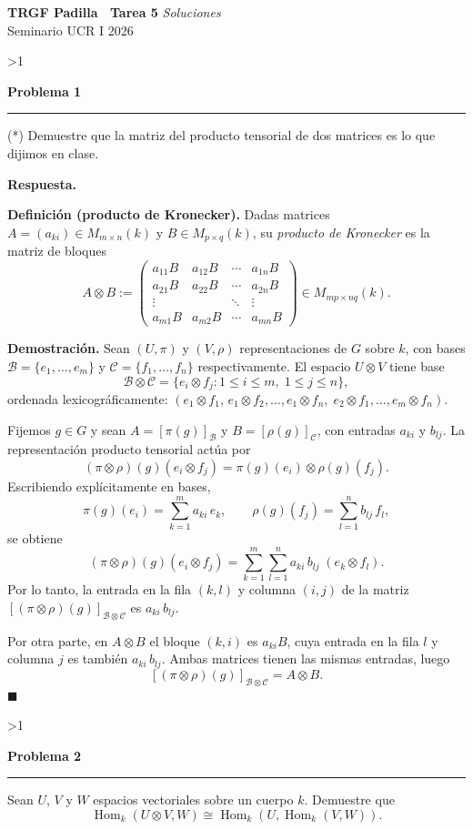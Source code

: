 \documentclass[10pt,a4paper]{article}
\newcommand{\Hom}{\operatorname{Hom}}
\newcommand{\inlinehead}[2][repblue]{%
  \par\smallskip
  {\color{#1}\bfseries #2.}\hspace{0.45em}%
}
\newcommand{\answer}{\inlinehead{Respuesta}}
\newcommand{\topbanner}{%
  \begin{tcolorbox}[
    colback=replight,
    colframe=repline,
    borderline west={1.2pt}{0pt}{repblue},
    borderline east={1.2pt}{0pt}{repteal},
    left=1.0em,
    right=1.0em,
    top=0.7em,
    bottom=0.55em
  ]
    {\Large\bfseries\color{repblue} TRGF Padilla \textemdash\ Tarea 5}\hfill
    {\color{repaccent}\small\itshape Soluciones}\\[-0.1em]
    {\normalsize\color{repteal} Seminario UCR I 2026}
  \end{tcolorbox}
}
\newcounter{probcnt}
\newcommand{\problem}[2]{%
  \stepcounter{probcnt}%
  \ifnum\value{probcnt}>1\newpage\fi
  \par\vspace{0.25em}
  {\large\bfseries\color{repblue} Problema #1}\par
  {\color{repline}\rule{\linewidth}{0.55pt}}\par
  \begin{tcolorbox}[
    breakable,
    colback=white,
    colframe=repline,
    borderline west={1.6pt}{0pt}{repteal},
    left=0.7em,
    right=0.7em,
    top=0.35em,
    bottom=0.3em,
    before skip=0.35em,
    after skip=0.45em
  ]
    #2
  \end{tcolorbox}
}
\begin{document}
\color{black}
\topbanner
\small

\problem{1}{%
(*) Demuestre que la matriz del producto tensorial de dos matrices es lo que dijimos en clase.
}

\answer
\medskip

\textbf{Definición (producto de Kronecker).} Dadas matrices $A=(a_{ki})\in M_{m\times n}(k)$
y $B\in M_{p\times q}(k)$, su \emph{producto de Kronecker} es la matriz de bloques
\[
  A\otimes B
  :=
  \begin{pmatrix}
    a_{11}B & a_{12}B & \cdots & a_{1n}B \\
    a_{21}B & a_{22}B & \cdots & a_{2n}B \\
    \vdots  &         & \ddots & \vdots  \\
    a_{m1}B & a_{m2}B & \cdots & a_{mn}B
  \end{pmatrix}
  \in M_{mp\times nq}(k).
\]

\medskip
\textbf{Demostración.}
Sean $(U,\pi)$ y $(V,\rho)$ representaciones de $G$ sobre $k$, con bases
$\mathcal{B}=\{e_1,\ldots,e_m\}$ y $\mathcal{C}=\{f_1,\ldots,f_n\}$ respectivamente.
El espacio $U\otimes V$ tiene base
\[
  \mathcal{B}\otimes\mathcal{C}
  =\{e_i\otimes f_j : 1\le i\le m,\;1\le j\le n\},
\]
ordenada lexicográficamente:
$(e_1\otimes f_1,\,e_1\otimes f_2,\ldots,e_1\otimes f_n,\;e_2\otimes f_1,\ldots,e_m\otimes f_n)$.

Fijemos $g\in G$ y sean $A=[\pi(g)]_{\mathcal{B}}$ y $B=[\rho(g)]_{\mathcal{C}}$,
con entradas $a_{ki}$ y $b_{lj}$.
La representación producto tensorial actúa por
\[
  (\pi\otimes\rho)(g)(e_i\otimes f_j)
  =\pi(g)(e_i)\otimes\rho(g)(f_j).
\]
Escribiendo explícitamente en bases,
\[
  \pi(g)(e_i)=\sum_{k=1}^m a_{ki}\,e_k,
  \qquad
  \rho(g)(f_j)=\sum_{l=1}^n b_{lj}\,f_l,
\]
se obtiene
\[
  (\pi\otimes\rho)(g)(e_i\otimes f_j)
  =\sum_{k=1}^{m}\sum_{l=1}^{n} a_{ki}\,b_{lj}\;(e_k\otimes f_l).
\]
Por lo tanto, la entrada en la fila $(k,l)$ y columna $(i,j)$ de la matriz
$[(\pi\otimes\rho)(g)]_{\mathcal{B}\otimes\mathcal{C}}$ es $a_{ki}\,b_{lj}$.

Por otra parte, en $A\otimes B$ el bloque $(k,i)$ es $a_{ki}B$, cuya entrada
en la fila $l$ y columna $j$ es también $a_{ki}\,b_{lj}$.
Ambas matrices tienen las mismas entradas, luego
\[
  [(\pi\otimes\rho)(g)]_{\mathcal{B}\otimes\mathcal{C}} = A\otimes B.
\]
\hfill$\blacksquare$

\problem{2}{%
Sean $U$, $V$ y $W$ espacios vectoriales sobre un cuerpo $k$. Demuestre que
\[
  \Hom_k(U \otimes V, W) \cong \Hom_k(U, \Hom_k(V, W)).
\]
}
\end{document}
